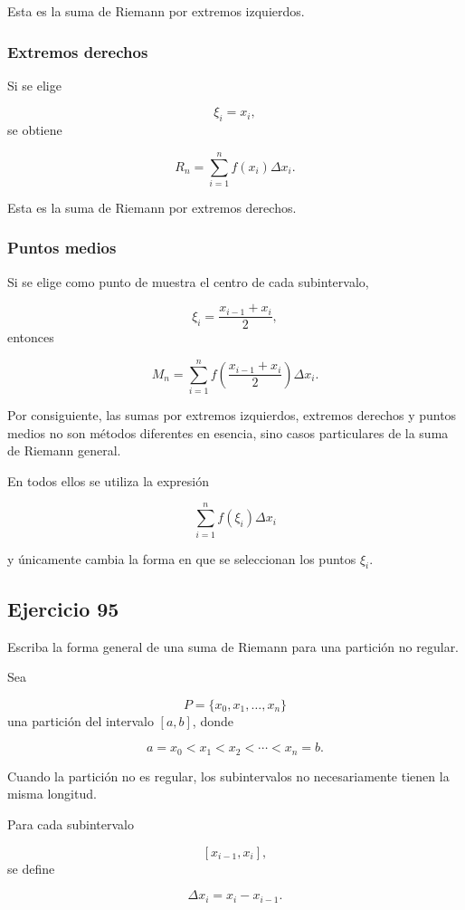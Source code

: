 \documentclass[12pt]{article}
\begin{document}
Esta es la suma de Riemann por extremos izquierdos.

\subsubsection*{Extremos derechos}

Si se elige

\[
\xi_i=x_i,
\]
se obtiene

\[
R_n
=
\sum_{i=1}^{n}
f(x_i)\Delta x_i.
\]

Esta es la suma de Riemann por extremos derechos.

\subsubsection*{Puntos medios}

Si se elige como punto de muestra el centro de cada subintervalo,

\[\xi_i=\frac{x_{i-1}+x_i}{2},\]
entonces

\[M_n=\sum_{i=1}^{n}f\left(\frac{x_{i-1}+x_i}{2}\right)\Delta x_i.\]

Por consiguiente, las sumas por extremos izquierdos, extremos derechos y
puntos medios no son métodos diferentes en esencia, sino casos
particulares de la suma de Riemann general.

En todos ellos se utiliza la expresión

\[\boxed{\sum_{i=1}^{n}f(\xi_i)\Delta x_i}\]

y únicamente cambia la forma en que se seleccionan los puntos
\(\xi_i\).

\subsection*{Ejercicio 95}

Escriba la forma general de una suma de Riemann para una partición no
regular.

Sea

\[P=\{x_0,x_1,\ldots,x_n\}\]
una partición del intervalo \([a,b]\), donde

\[a=x_0<x_1<x_2<\cdots<x_n=b.\]

Cuando la partición no es regular, los subintervalos no necesariamente
tienen la misma longitud.

Para cada subintervalo

\[[x_{i-1},x_i],\]
se define

\[
\Delta x_i=x_i-x_{i-1}.
\]
\end{document}
